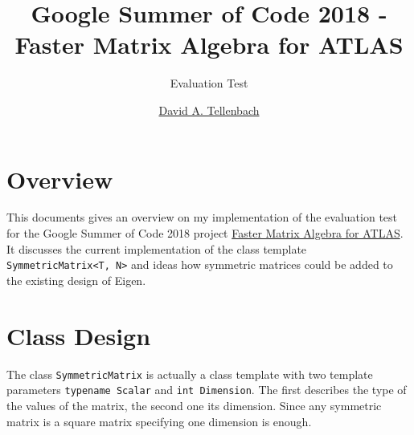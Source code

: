 \documentclass[a4wide]{scrartcl}
\begin{document}
\title{Google Summer of Code 2018 - Faster Matrix Algebra for ATLAS}
\subtitle{Evaluation Test}
\author{\href{mailto: tellenbach@cip.ifi.lmu.de}{David A. Tellenbach}}
\maketitle
\section{Overview}
This documents gives an overview on my implementation of the evaluation test for the Google Summer of Code 2018 project \href{https://github.com/StewMH/GSoC2018/blob/master/evaluation_test.pdf}{Faster Matrix Algebra for ATLAS}. It discusses the current implementation of the class template \texttt{SymmetricMatrix<T, N>} and ideas how symmetric matrices could be added to the existing design of Eigen.
\section{Class Design}
The class \texttt{SymmetricMatrix} is actually a class template with two template parameters \texttt{typename Scalar} and \texttt{int Dimension}. The first describes the type of the values of the matrix, the second one its dimension. Since any symmetric matrix is a square matrix specifying one dimension is enough.
\end{document}
